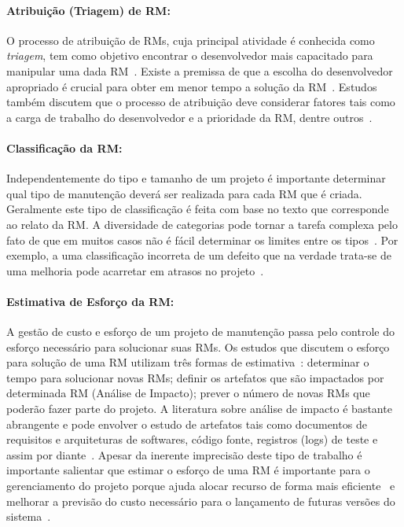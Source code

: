 \paragraph{Atribuição (Triagem) de RM:}

O processo de atribuição de RMs, cuja principal atividade é conhecida como
\textit{triagem}, tem como objetivo encontrar o desenvolvedor mais capacitado
para manipular uma dada RM~\cite{cavalcanti2014challenges}. Existe a premissa de
que a escolha do desenvolvedor apropriado é crucial para obter em menor tempo a
so\-lu\-ção da RM~\cite{di2002approach}. Estudos também discutem que o processo
de atribuição deve considerar fatores tais como a carga de trabalho do
desenvolvedor e a prioridade da RM, dentre outros~\cite{aljarah2011selecting}.

\paragraph{Classificação da RM:}

Independentemente do tipo e tamanho de um projeto é importante determinar qual
tipo de manutenção deverá ser realizada para cada RM que é criada. Geralmente
este tipo de classificação é feita com base no texto que corresponde ao relato
da RM\@. A diversidade de categorias pode tornar a tarefa complexa pelo fato de
que em muitos casos não é fácil determinar os limites entre os
tipos~\cite{antoniol2008bug}. Por exemplo, a uma classificação incorreta de um
defeito que na verdade trata-se de uma melhoria pode acarretar em atrasos no
projeto~\cite{cavalcanti2014challenges}.

\paragraph{Estimativa de Esforço da RM:}

A gestão de custo e esforço de um projeto de manutenção passa pelo controle do
esforço necessário para solucionar suas RMs. Os estudos que discutem o esforço
para solução de uma RM utilizam três formas de
estimativa~\cite{cavalcanti2014challenges}: determinar o tempo para solucionar
novas RMs; definir os artefatos que são impactados por determinada RM (Análise
de Impacto); prever o número de novas RMs que poderão fazer parte do projeto. A
literatura sobre análise de impacto é bastante abrangente e pode envolver o
estudo de artefatos tais como documentos de requisitos e arquiteturas de
softwares, código fonte, registros (logs) de teste e assim por
diante~\cite{cavalcanti2014challenges}.  Apesar da inerente imprecisão deste
tipo de trabalho é importante salientar que estimar o esforço de uma RM é
importante para o gerenciamento do projeto porque ajuda alocar recurso de forma
mais eficiente~\cite{Bhattacharya:2011:BTP:1985441.1985472} e melhorar a
previsão do custo necessário para o lançamento de futuras versões do
sistema~\cite{Vijayakumar2014}.

